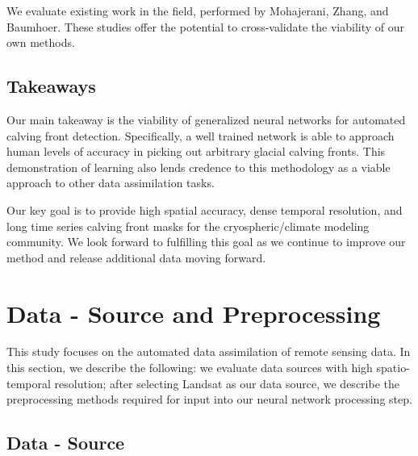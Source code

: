 \documentclass[tc, manuscript]{copernicus}
\begin{document}
We evaluate existing work in the field, performed by Mohajerani, Zhang, and Baumhoer. These studies offer the potential to cross-validate the viability of our own methods.

\subsection{Takeaways}
Our main takeaway is the viability of generalized neural networks for automated calving front detection. Specifically, a well trained network is able to approach human levels of accuracy in picking out arbitrary glacial calving fronts. This demonstration of learning also lends credence to this methodology as a viable approach to other data assimilation tasks.

Our key goal is to provide high spatial accuracy, dense temporal resolution, and long time series calving front masks for the cryospheric/climate modeling community. We look forward to fulfilling this goal as we continue to improve our method and release additional data moving forward.

\section{Data - Source and Preprocessing}
This study focuses on the automated data assimilation of remote sensing data. In this section, we describe the following: we evaluate data sources with high spatio-temporal resolution; after selecting Landsat as our data source, we describe the preprocessing methods required for input into our neural network processing step.

\subsection{Data - Source}
\end{document}
